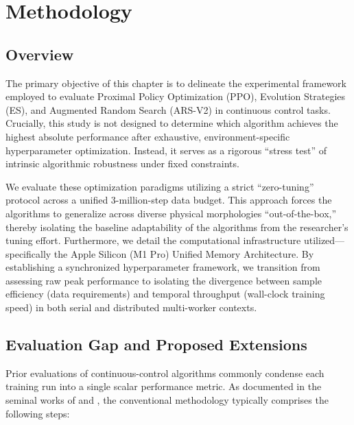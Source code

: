 %
%
\chapter{Methodology}
\label{chap:Methodology}
\setlength{\parskip}{1em}
%

\section{Overview}

The primary objective of this chapter is to delineate the experimental framework employed to evaluate Proximal Policy Optimization (PPO), Evolution Strategies (ES), and Augmented Random Search (ARS-V2) in continuous control tasks. Crucially, this study is not designed to determine which algorithm achieves the highest absolute performance after exhaustive, environment-specific hyperparameter optimization. Instead, it serves as a rigorous ``stress test'' of intrinsic algorithmic robustness under fixed constraints.

We evaluate these optimization paradigms utilizing a strict ``zero-tuning'' protocol across a unified 3-million-step data budget. This approach forces the algorithms to generalize across diverse physical morphologies ``out-of-the-box,'' thereby isolating the baseline adaptability of the algorithms from the researcher's tuning effort. Furthermore, we detail the computational infrastructure utilized---specifically the Apple Silicon (M1 Pro) Unified Memory Architecture. By establishing a synchronized hyperparameter framework, we transition from assessing raw peak performance to isolating the divergence between sample efficiency (data requirements) and temporal throughput (wall-clock training speed) in both serial and distributed multi-worker contexts.

\section{Evaluation Gap and Proposed Extensions}

Prior evaluations of continuous-control algorithms commonly condense each training run into a single scalar performance metric. As documented in the seminal works of \citep{schulman2017ppo} and \citep{mania2018randomsearch}, the conventional methodology typically comprises the following steps:

